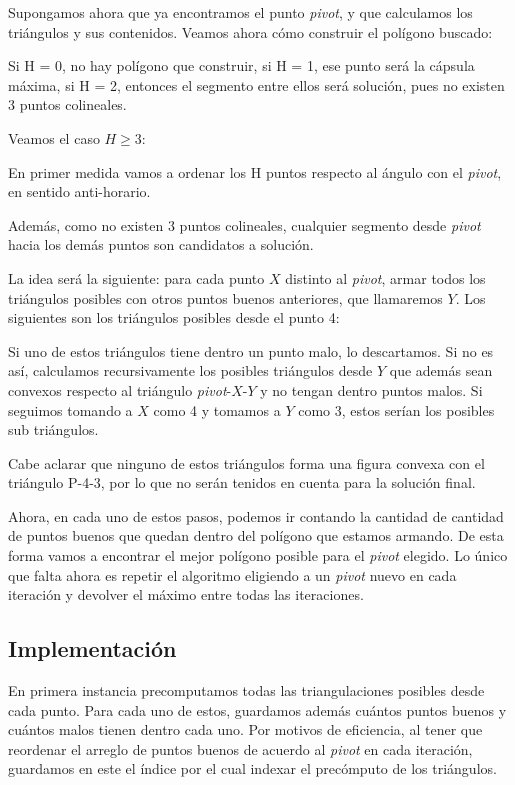 Supongamos ahora que ya encontramos el punto \textit{pivot}, y que calculamos los triángulos y sus contenidos. Veamos ahora cómo construir el polígono buscado:

Si H = 0, no hay polígono que construir, si H = 1, ese punto será la cápsula máxima, si H = 2, entonces el segmento entre ellos será solución, pues no existen 3 puntos colineales.

Veamos el caso $H \geq 3$:

En primer medida vamos a ordenar los H puntos respecto al ángulo con el \textit{pivot}, en sentido anti-horario.


Además, como no existen 3 puntos colineales, cualquier segmento desde \textit{pivot} hacia los demás puntos son candidatos a solución.

La idea será la siguiente: para cada punto $X$ distinto al \textit{pivot}, armar todos los triángulos posibles con otros puntos buenos anteriores, que llamaremos $Y$. Los siguientes son los triángulos posibles desde el punto 4:


Si uno de estos triángulos tiene dentro un punto malo, lo descartamos. Si no es así, calculamos recursivamente los posibles triángulos desde $Y$ que además sean convexos respecto al triángulo \textit{pivot}-$X$-$Y$ y no tengan dentro puntos malos. Si seguimos tomando a $X$ como 4 y tomamos a $Y$ como 3, estos serían los posibles sub triángulos.


Cabe aclarar que ninguno de estos triángulos forma una figura convexa con el triángulo P-4-3, por lo que no serán tenidos en cuenta para la solución final.

Ahora, en cada uno de estos pasos, podemos ir contando la cantidad de cantidad de puntos buenos que quedan dentro del polígono que estamos armando. De esta forma vamos a encontrar el mejor polígono posible para el \textit{pivot} elegido. Lo único que falta ahora es repetir el algoritmo eligiendo a un \textit{pivot} nuevo en cada iteración y devolver el máximo entre todas las iteraciones.

\subsection{Implementación}
En primera instancia precomputamos todas las triangulaciones posibles desde cada punto. Para cada uno de estos, guardamos además cuántos puntos buenos y cuántos malos tienen dentro cada uno. Por motivos de eficiencia, al tener que reordenar el arreglo de puntos buenos de acuerdo al \textit{pivot} en cada iteración, guardamos en este el índice por el cual indexar el precómputo de los triángulos.

